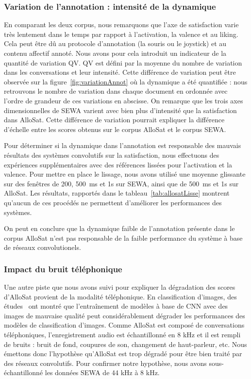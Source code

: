 \subsubsection{Variation de l'annotation : intensité de la dynamique}
En comparant les deux corpus, nous remarquons que l'axe de satisfaction varie très lentement dans le temps par rapport à l'activation, la valence et au liking. Cela peut être dû au protocole d'annotation (la souris ou le joystick) et au contenu affectif annoté. Nous avons pour cela introduit un indicateur de la quantité de variation QV. QV est défini par la moyenne du nombre de variation dans les conversations et leur intensité. Cette différence de variation peut être observée sur la figure~\ref{fig:variationAnnot} où la dynamique a été quantifiée : nous retrouvons le nombre de variation dans chaque document en ordonnée avec l'ordre de grandeur de ces variations en abscisse. On remarque que les trois axes dimensionnelles de SEWA varient avec bien plus d'intensité que la satisfaction dans AlloSat. %
Cette différence de variation pourrait expliquer la différence d'échelle entre les scores obtenus sur le corpus AlloSat et le corpus SEWA.


Pour déterminer si la dynamique dans l'annotation est responsable des mauvais résultats des systèmes convolutifs sur la satisfaction, nous effectuons des expériences supplémentaires avec des références lissées pour l'activation et la valence. Pour mettre en place le lissage, nous avons utilisé une moyenne glissante sur des fenêtres de 200, 500~ms et 1s sur SEWA, ainsi que de 500~ms et 1s sur AlloSat. Les résultats, rapportés dans le tableau~\ref{tab:allosatLisse} montrent qu'aucun de ces procédés ne permettent d'améliorer les performances des systèmes.



On peut en conclure que la dynamique faible de l'annotation présente dans le corpus AlloSat n'est pas responsable de la faible performance du système à base de réseaux convolutionels.

\subsubsection{Impact du bruit téléphonique}
Une autre piste que nous avons suivi pour expliquer la dégradation des scores d'AlloSat provient de la modalité téléphonique.
En classification d'images, des études~\cite{Roy2018,Dodge2016} ont montré que l'entraînement de modèles à base de CNN avec des images de mauvaise qualité peut considérablement dégrader les performances des modèles de classification d'images.
Comme AlloSat est composé de conversations téléphoniques, l'enregistrement audio est échantillonné en 8 kHz et il est rempli de bruits : bruit de fond, coupures de son, changement de haut-parleur, etc. Nous émettons donc l'hypothèse qu'AlloSat est trop dégradé pour être bien traité par des réseaux convolutifs.
Pour confirmer notre hypothèse, nous avons sous-échantillonné les données SEWA de 44 kHz à 8 kHz.

